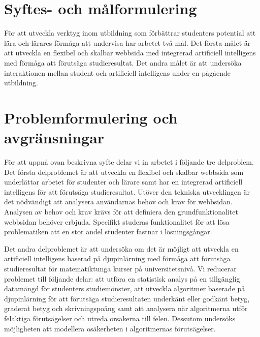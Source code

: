 
\section{Syftes- och målformulering}
\label{sec:purpose_and_problem}
För att utveckla verktyg inom utbildning som förbättrar studenters potential att lära och lärares förmåga att undervisa har arbetet två mål. Det första målet är att utveckla en flexibel och skalbar webbsida med integrerad artificiell intelligens med förmåga att förutsäga studieresultat. Det andra målet är att undersöka interaktionen mellan student och artificiell intelligens under en pågående utbildning.

\section{Problemformulering och avgränsningar}
För att uppnå ovan beskrivna syfte delar vi in arbetet i följande tre delproblem. Det första delproblemet är att utveckla en flexibel och skalbar webbsida som underlättar arbetet för studenter och lärare samt har en integrerad artificiell intelligens för att förutsäga studieresultat. Utöver den tekniska utvecklingen är det nödvändigt att analysera användarnas behov och krav för webbsidan. Analysen av behov och krav krävs för att definiera den grundfunktionalitet webbsidan behöver erbjuda. Specifikt studeras funktionalitet för att lösa problematiken att en stor andel studenter fastnar i lösningsgångar.

Det andra delproblemet är att undersöka om det är möjligt att utveckla en artificiell intelligens baserad på djupinlärning med förmåga att förutsäga studieresultat för matematiktunga kurser på universitetsnivå. Vi reducerar problemet till följande delar: att utföra en statistisk analys på en tillgänglig datamängd för studenters studiemönster, att utveckla algoritmer baserade på djupinlärning för att förutsäga studieresultaten underkänt eller godkänt betyg, graderat betyg och skrivningspoäng samt att analysera när algoritmerna utför felaktiga förutsägelser och utreda orsakerna till felen. Dessutom undersöks möjligheten att modellera osäkerheten i algoritmernas förutsägelser. 

